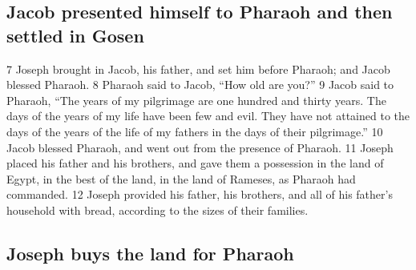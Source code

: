 \hypertarget{jacob-presented-himself-to-pharaoh-and-then-settled-in-gosen}{%
\subsection{Jacob presented himself to Pharaoh and then settled in
Gosen}\label{jacob-presented-himself-to-pharaoh-and-then-settled-in-gosen}}

{7} Joseph brought in Jacob, his father, and set him before Pharaoh; and
Jacob blessed Pharaoh. {8} Pharaoh said to Jacob, ``How old are you?''
{9} Jacob said to Pharaoh, ``The years of my pilgrimage are one hundred
and thirty years. The days of the years of my life have been few and
evil. They have not attained to the days of the years of the life of my
fathers in the days of their pilgrimage.'' {10} Jacob blessed Pharaoh,
and went out from the presence of Pharaoh. {11} Joseph placed his father
and his brothers, and gave them a possession in the land of Egypt, in
the best of the land, in the land of Rameses, as Pharaoh had commanded.
{12} Joseph provided his father, his brothers, and all of his father's
household with bread, according to the sizes of their families.

\hypertarget{joseph-buys-the-land-for-pharaoh}{%
\subsection{Joseph buys the land for
Pharaoh}\label{joseph-buys-the-land-for-pharaoh}}

